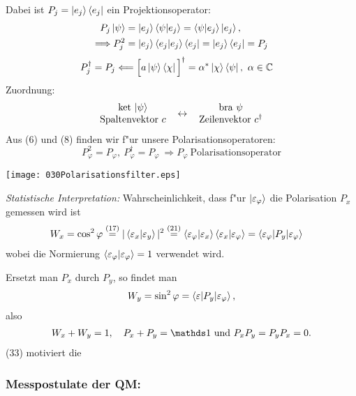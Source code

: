 \documentclass[a4paper]{scrartcl}
\begin{document}
{Dabei ist $P_j = \ket{e_j} \bra{e_j}$ ein Projektionsoperator:
\begin{align}
P_j \ket{\psi} & = \ket {e_j} \braket{ \psi| e_j}  = \braket{ \psi | e_j} \ket{e_j}, \\
\Longrightarrow P_j^2 & = \ket{e_j} \braket{e_j | e_j } \bra{e_j} = \ket{e_j} \bra{e_j} = P_j \notag
\end{align}
\begin{align}
P_j^\dagger & = P_j \Longleftarrow \Big[ a \ket{\psi}\bra{\chi} \Big]^\dagger = \alpha^* \ket{\chi} \bra{\psi}, \ \alpha \in \mathbb{C}
\end{align}
Zuordnung:
\begin{align}
\mathrm{
\begin{tabular}{c c c}
ket $\ket{\psi}$ & \multirow{2}{*}{$\leftrightarrow$} & bra $\psi$ \\
Spaltenvektor $c$ & & Zeilenvektor $c^\dagger$
\end{tabular}
}
\end{align}
Aus (6) und (8) finden wir f"ur unsere Polarisationsoperatoren:
$$P_\varphi^2 = P_\varphi, \ P_\varphi^\dagger = P_\varphi \ \Longrightarrow P_\varphi \mathrm{ \ Polarisationsoperator}$$
\begin{center}
\texttt{[image: 030Polarisationsfilter.eps]}
\end{center}
\emph{Statistische Interpretation:} Wahrscheinlichkeit, dass f"ur $\ket{ \varepsilon_\varphi}$ die Polarisation $P_x$ gemessen wird ist 
\begin{align}
W_x & = \cos^2 \varphi 
 \stackrel{(17)}= | \braket {\varepsilon_x | \varepsilon_y } |^2 
 \stackrel{(21)}= \braket{ \varepsilon_\varphi | \varepsilon_x} \braket{ \varepsilon_x | \varepsilon_\varphi} 
 = \braket{ \varepsilon_\varphi | P_y | \varepsilon_\varphi}
\end{align}
wobei die Normierung $\braket{ \varepsilon_\varphi | \varepsilon_\varphi } = 1$ verwendet wird.

Ersetzt man $P_x$ durch $P_y$, so findet man 
\begin{align}
W_y = \sin^2 \varphi = \braket{ \varepsilon | P_y | \varepsilon_\varphi},
\end{align}
also
\begin{align}
W_x + W_y = 1, \quad P_x + P_y = \dOne \ \mathrm{und} \ P_xP_y = P_yP_x = 0.
\end{align}
(33) motiviert die 

\subsubsection*{Messpostulate der QM:}

}
\end{document}
